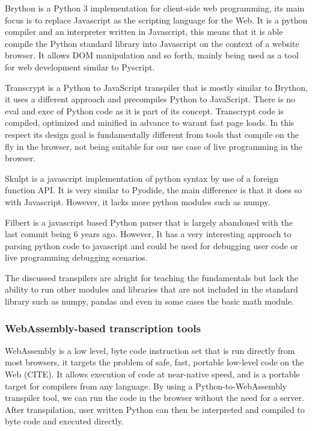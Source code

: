 Brython is a Python 3 implementation for client-side web programming, its main focus is to replace Javascript as the scripting language for the Web. It is a python compiler and an interpreter written in Javascript, this means that it is able compile the Python standard library into Javascript on the context of a website browser. It allows DOM manipulation and so forth, mainly being used as a tool for web development similar to Pyscript.

Transcrypt is a Python to JavaScript transpiler that is mostly similar to Brython, it uses a different approach and precompiles Python to JavaScript. There is no eval and exec of Python code as it is part of its concept. Transcrypt code is compiled, optimized and minified in advance to warant fast page loads. In this respect its design goal is fundamentally different from tools that compile on the fly in the browser, not being suitable for our use case of live programming in the browser.

Skulpt is a javascript implementation of python syntax by use of a foreign function API. It is very similar to Pyodide, the main difference is that it does so with Javascript. However, it lacks more python modules such as numpy. 

Filbert is a javascript based Python parser that is largely abandoned with the last commit being 6 years ago. However, It has a very interesting approach to parsing python code to javascript and could be used for debugging user code or live programming debugging scenarios.

The discussed transpilers are alright for teaching the fundamentals but lack the ability to run other modules and libraries that are not included in the standard library such as numpy, pandas and even in some cases the basic math module.

\subsubsection{WebAssembly-based transcription tools}
WebAssembly is a low level, byte code instruction set that is run directly from most browsers, it targets the problem of safe, fast, portable low-level code on the Web (CITE). It allows execution of code at near-native speed, and is a portable target for compilers from any language. By using a Python-to-WebAssembly transpiler tool, we can run the code in the browser without the need for a server. After transpilation, user written Python can then be interpreted and compiled to byte code and executed directly.

